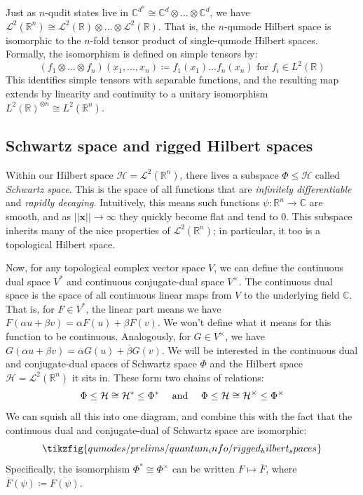 Just as $n$-qudit states live in $\mathbb{C}^{d^n} \cong \mathbb{C}^d \otimes \ldots \otimes \mathbb{C}^d$, we have $\mathcal{L}^2(\mathbb{R}^n) \cong \mathcal{L}^2(\mathbb{R}) \otimes \ldots \otimes \mathcal{L}^2(\mathbb{R})$.
That is, the $n$-qumode Hilbert space is isomorphic to the $n$-fold tensor product of single-qumode Hilbert spaces.
Formally, the isomorphism is defined on simple tensors by:
\begin{equation}
    (f_1 \otimes \ldots \otimes f_n)(x_1,\dots,x_n) \coloneqq f_1(x_1)\ldots f_n(x_n) \text{ for $f_i \in L^2(\mathbb{R})$}
\end{equation}
This identifies simple tensors with separable functions, and the resulting map extends by linearity and continuity to a unitary isomorphism $L^2(\mathbb{R})^{\otimes n} \cong L^2(\mathbb{R}^n)$.

\subsection{Schwartz space and rigged Hilbert spaces}

Within our Hilbert space $\mathcal{H} = \mathcal{L}^2(\mathbb{R}^n)$, there lives a subspace $\Phi \leq \mathcal{H}$ called \textit{Schwartz space}.
This is the space of all functions that are \textit{infinitely differentiable} and \textit{rapidly decaying}.
Intuitively, this means such functions $\psi: \mathbb{R}^n \to \mathbb{C}$ are smooth, and as $|| \boldsymbol{x} || \to \infty$ they quickly become flat and tend to $0$.
This subspace inherits many of the nice properties of $\mathcal{L}^2(\mathbb{R}^n)$; in particular, it too is a topological Hilbert space.

Now, for any topological complex vector space $V$, we can define the continuous dual space $V^*$ and continuous conjugate-dual space $V^\times$.
The continuous dual space is the space of all continuous linear maps from $V$ to the underlying field $\mathbb{C}$.
That is, for $F \in V^*$, the linear part means we have $F(\alpha u + \beta v) = \alpha F(u) + \beta F(v)$.
We won't define what it means for this function to be continuous.
Analogously, for $G \in V^\times$, we have $G(\alpha u + \beta v) = \overline{\alpha} G(u) + \overline{\beta} G(v)$.
We will be interested in the continuous dual and conjugate-dual spaces of Schwartz space $\Phi$ and the Hilbert space $\mathcal{H} = \mathcal{L}^2(\mathbb{R}^n)$ it sits in.
These form two chains of relations:
\begin{equation}\label{eq:rigged_spaces_separate}
\Phi \leq \mathcal{H} \cong \mathcal{H}^* \leq \Phi^* \quad \text{ and } \quad \Phi \leq \mathcal{H} \cong \mathcal{H}^\times \leq \Phi^{\times}
\end{equation}
We can squish all this into one diagram, and combine this with the fact that the continuous dual and conjugate-dual of Schwartz space are isomorphic:
\begin{equation}\label{eq:rigged_spaces_combined}
    \tikzfig{qumodes/prelims/quantum_info/rigged_hilbert_spaces}
\end{equation}
Specifically, the isomorphism $\Phi^* \cong \Phi^\times$ can be written $F \mapsto \overline{F}$, where $\overline{F}(\psi) \coloneqq \overline{F(\psi)}$.

